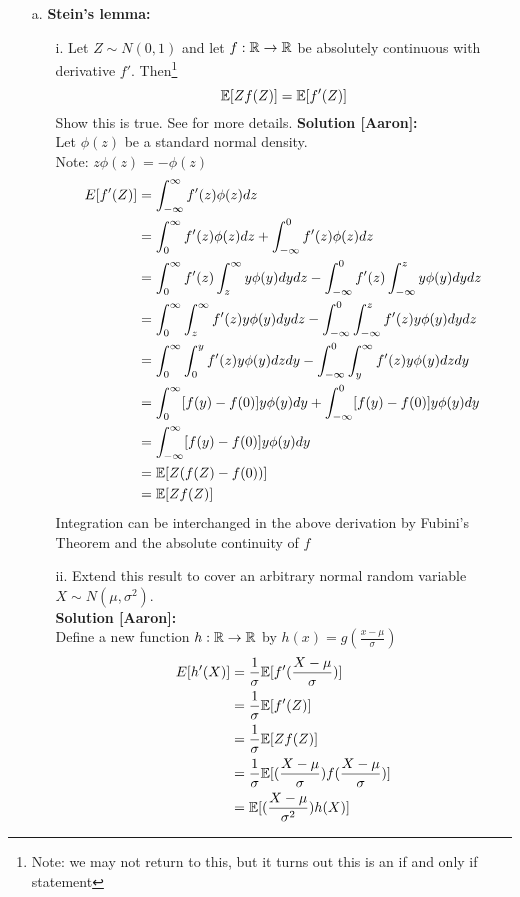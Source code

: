 \documentclass[11pt]{article}
\begin{document}
\begin{enumerate}
\begin{itemize}
\item[a.] \textbf{Stein's lemma:}
\begin{itemize}
\item[i.] Let $Z \sim N(0,1)$ and let $f: \mathbb{R} \rightarrow \mathbb{R}$ be absolutely continuous with derivative $f'$.  Then\footnote{Note:
we may not return to this, but it turns out this is an if and only if statement}
\[
\mathbb{E}[Z f(Z)] = \mathbb{E}[f'(Z)]
\]
Show this is true. See \cite{stein1981estimation} for more details.
\newpage
\textbf{Solution [Aaron]:} \\
Let \(\phi(z)\) be a standard normal density. \\
Note: \(z\phi(z) = -\phi(z)\)
\begin{equation*}
\begin{split}
E[f'(Z)] & = \int_{-\infty}^{\infty} f'(z) \phi(z) dz \\
& = \int_0^{\infty} f'(z) \phi(z) dz + \int_{-\infty}^0 f'(z) \phi(z) dz \\
& = \int_0^{\infty} f'(z) \int_z^{\infty} y \phi(y) dy dz - \int_{-\infty}^0 f'(z) \int_{-\infty}^z y \phi(y) dy dz \\
& = \int_0^{\infty} \int_z^{\infty} f'(z) y \phi(y) dy dz - \int_{-\infty}^0 \int_{-\infty}^z f'(z) y \phi(y) dy dz \\
& = \int_0^{\infty} \int_0^y f'(z) y \phi(y) dz dy - \int_{-\infty}^0 \int_y^{\infty} f'(z) y \phi(y) dz dy \\
& = \int_0^{\infty} [f(y) -f(0)] y \phi(y) dy + \int_{-\infty}^0 [f(y) - f(0)] y \phi(y) dy\\
& = \int_{-\infty}^{\infty} [f(y) - f(0)] y \phi(y) dy \\
& = \mathbb{E}[Z(f(Z)-f(0))] \\
& = \mathbb{E}[Z f(Z)]
\end{split}
\end{equation*}
Integration can be interchanged in the above derivation by Fubini's Theorem and the absolute continuity of \(f\) \\

\item[ii.] Extend this result to cover an arbitrary normal random variable $X \sim N(\mu,\sigma^2)$. \\
\textbf{Solution [Aaron]:} \\
Define a new function $h: \mathbb{R} \rightarrow \mathbb{R}$ by \(h(x) = g(\frac{x-\mu}{\sigma})\)
\begin{equation*}
\begin{split}
E[h'(X)] & = \frac{1}{\sigma} \mathbb{E}[f'(\frac{X-\mu}{\sigma})] \\
& = \frac{1}{\sigma} \mathbb{E}[f'(Z)] \\
& = \frac{1}{\sigma} \mathbb{E}[Zf(Z)] \\
& = \frac{1}{\sigma} \mathbb{E}[(\frac{X-\mu}{\sigma}) f(\frac{X-\mu}{\sigma})] \\
& = \mathbb{E}[(\frac{X-\mu}{\sigma^2})h(X)]
\end{split}
\end{equation*}


\end{itemize}
\end{itemize}
\end{enumerate}
\end{document}
